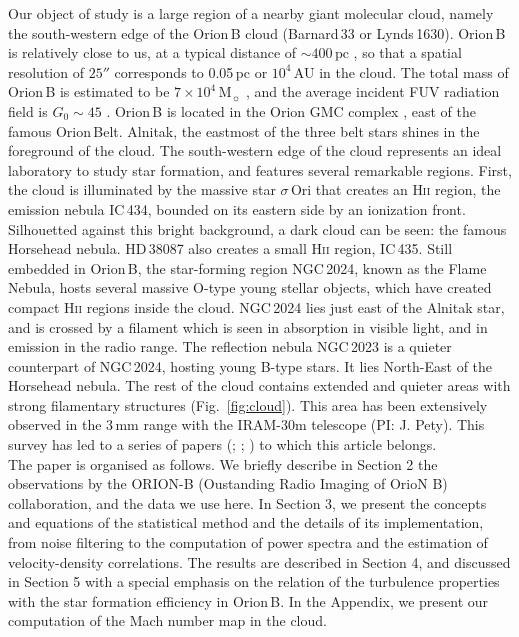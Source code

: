 \documentclass[structabstract]{aa}
\newcommand{\emm}[1]{\ensuremath{#1}}
\newcommand{\emr}[1]{\emm{\mathrm{#1}}}
\newcommand{\unit}[1]{\emr{\,#1}}
\newcommand{\Msun}{\unit{M_{\sun}}}
\newcommand{\pc}{\unit{pc}}
\newcommand{\Hii}{\textsc{Hii}}
\begin{document}
Our object of study is a large region of a nearby giant molecular cloud, namely the south-western edge of the Orion\,B cloud (Barnard\,33 or Lynds\,1630). Orion\,B is relatively close to us, at a typical distance of $\sim 400\pc$ \citep{menten07,schlafly14}, so that a spatial resolution of $25''$ corresponds to 0.05\,pc or $10^4$\,AU in the cloud. The total mass of Orion\,B is estimated to be $7 \times 10^4\Msun$ \citep{lombardi14}, and the average incident FUV radiation field is $G_0 \sim 45$ \citep{pety16}. Orion\,B is located in the Orion GMC complex \citep{kramer96,ripple13}, east of the famous Orion\,Belt. Alnitak, the eastmost of the three belt stars shines in the foreground of the cloud. The south-western edge of the cloud represents an ideal laboratory to study star formation, and features several remarkable regions. First, the cloud is illuminated by the massive star $\sigma$\,Ori that creates an \Hii{} region, the emission nebula IC\,434, bounded on its eastern side by an ionization front. Silhouetted against this bright background, a dark cloud can be seen: the famous Horsehead nebula. HD\,38087 also creates a small \textsc{Hii} region, IC\,435. Still embedded in Orion\,B, the star-forming region NGC\,2024, known as the Flame Nebula, hosts several massive O-type young stellar objects, which have created compact \Hii{} regions inside the cloud. NGC\,2024 lies just east of the Alnitak star, and is crossed by a filament which is seen in absorption in visible light, and in emission in the radio range. The reflection nebula NGC\,2023 is a quieter counterpart of NGC\,2024, hosting young B-type stars. It lies North-East of the Horsehead nebula. The rest of the cloud contains extended and quieter areas with strong filamentary structures (Fig.~\ref{fig:cloud}). This area has been extensively observed in the 3\,mm range with the IRAM-30m telescope (PI: J. Pety). This survey has led to a series of papers (\citet{liszt16}; \citet{pety16}; \citet{gratier16}) to which this article belongs.
\\

The paper is organised as follows. We briefly describe in Section 2 the observations by the ORION-B (Oustanding Radio Imaging of OrioN B) collaboration, and the data we use here. In Section 3, we present the concepts and equations of the statistical method and the details of its implementation, from noise filtering to the computation of power spectra and the estimation of velocity-density correlations. The results are described in Section 4, and discussed in Section 5 with a special emphasis on the relation of the turbulence properties with the star formation efficiency in Orion\,B. In the Appendix, we present our computation of the Mach number map in the cloud.
\end{document}

